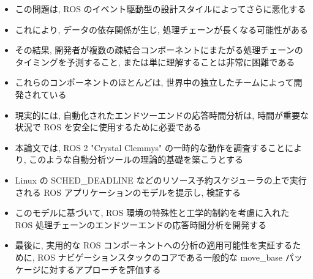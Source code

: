 \begin{frame}{}
    \begin{itemize}
        \item この問題は, ROS のイベント駆動型の設計スタイルによってさらに悪化する
        \item これにより, データの依存関係が生じ, 処理チェーンが長くなる可能性がある
        \item その結果, 開発者が複数の疎結合コンポーネントにまたがる処理チェーンのタイミングを予測すること, または単に理解することは非常に困難である
        \item これらのコンポーネントのほとんどは, 世界中の独立したチームによって開発されている
        \item 現実的には, 自動化されたエンドツーエンドの応答時間分析は, 時間が重要な状況で ROS を安全に使用するために必要である
    \end{itemize}
\end{frame}


\begin{frame}{}
    \begin{itemize}
        \item 本論文では, ROS 2 "Crystal Clemmys" の一時的な動作を調査することにより, このような自動分析ツールの理論的基礎を築こうとする
        \item Linux の SCHED\_DEADLINE などのリソース予約スケジューラの上で実行される ROS アプリケーションのモデルを提示し, 検証する
        \item このモデルに基づいて, ROS 環境の特殊性と工学的制約を考慮に入れた ROS 処理チェーンのエンドツーエンドの応答時間分析を開発する
        \item 最後に, 実用的な ROS コンポーネントへの分析の適用可能性を実証するために, ROS ナビゲーションスタックのコアである一般的な move\_base パッケージに対するアプローチを評価する
    \end{itemize}
\end{frame}

